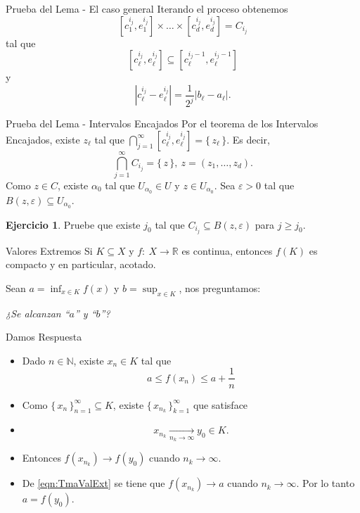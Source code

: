 \documentclass[utf8]{beamer}
\theoremstyle{plain}
\theoremstyle{definition}
\newtheorem{Ej}{Ejercicio}             %
\theoremstyle{remark}
\numberwithin{equation}{section}
\newcommand{\al}{\alpha}                %
\newcommand{\eps}{\varepsilon}          %
\newcommand{\bN}{\mathbb{N}}    %
\newcommand{\bR}{\mathbb{R}}    %
\newcommand{\set}[1]{\{\,#1\,\}}    %
\renewcommand{\geq}{\geqslant}          %
\renewcommand{\l}{\ell}                   %
\renewcommand{\leq}{\leqslant}          %
\newcommand{\xyx}{\times\dots\times}
\newcommand{\suck}{_{k=1}^\infty} %
\newcommand{\sucn}{_{n=1}^\infty} %
\begin{document}
\begin{frame}{Prueba del Lema - El caso general}
  Iterando el proceso obtenemos 
  $$[c_1^{i_j},e_1^{i_j}]\xyx[c_d^{i_j},e_d^{i_j}]=C_{i_j}$$
  tal que 
  $$[c_\l^{i_j},e_\l^{i_j}]\subseteq[c_\l^{i_j-1},e_\l^{i_j-1}]$$
  y 
  $$|c_\l^{i_j}-e_\l^{i_j}|=\frac{1}{2^j}|b_\l-a_\l|.$$
\end{frame}

\begin{frame}{Prueba del Lema - Intervalos Encajados}
  Por el teorema de los Intervalos Encajados, existe $z_\l$ tal que $\bigcap_{j=1}^\infty[c_\l^{i_j},e_\l^{i_j}]=\set{z_\l}$. Es decir,
  $$\bigcap_{j=1}^\infty C_{i_j}=\set{z},\ z=(z_1,\dots,z_d).$$
  Como $z\in C$, existe $\al_0$ tal que $U_{\al_0}\in U$ y $z\in U_{\al_0}$. Sea $\eps> 0$ tal que $B(z,\eps)\subseteq U_{\al_0}$.
\begin{Ej}\label{ej:ultimoDetallePrueba}
  Pruebe que existe $j_0$ tal que $C_{i_j}\subseteq B(z,\eps)$ para $j\geq j_0$.
\end{Ej}
\end{frame}

\begin{frame}{Valores Extremos}
  Si $K\subseteq X$ y $f:\ X\to\bR$ es continua, entonces $f(K)$ es compacto y en particular, acotado.\par 
  Sean $a=\inf_{x\in K}f(x)$ y $b=\sup_{x\in K}$, nos preguntamos:\par 
  \begin{center}
    \emph{¿Se alcanzan ``$a$'' y ``$b$''?}
  \end{center}
\end{frame}
\begin{frame}{Damos Respuesta}
  \begin{itemize}
    \item Dado $n\in\bN$, existe $x_n\in K$ tal que 
    \begin{equation}\label{eqn:TmaValExt}
      a\leq f(x_n)\leq a+\frac1n  
    \end{equation}
    \item Como $\set{x_n}\sucn\subseteq K$, existe $\set{x_{n_k}}\suck$ que satisface
    \item $$x_{n_k}\xrightarrow[n_k\to\infty]{}y_0\in K.$$
    \item Entonces $f(x_{n_k})\to f(y_0)$ cuando $n_k\to\infty$.
    \item De \ref{eqn:TmaValExt} se tiene que $f(x_{n_k})\to a$ cuando $n_k\to\infty$. Por lo tanto $a=f(y_0)$.
  \end{itemize}
  
\end{frame}
\end{document}
